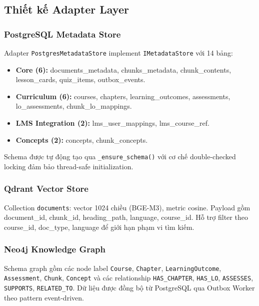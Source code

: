 \subsection{Thiết kế Adapter Layer}

\subsubsection{PostgreSQL Metadata Store}

Adapter \texttt{PostgresMetadataStore} implement
\texttt{IMetadataStore} với 14 bảng:

\begin{itemize}
    \item \textbf{Core (6):} documents\_metadata, chunks\_metadata,
          chunk\_contents, lesson\_cards, quiz\_items, outbox\_events.
    \item \textbf{Curriculum (6):} courses, chapters, learning\_outcomes,
          assessments, lo\_assessments, chunk\_lo\_mappings.
    \item \textbf{LMS Integration (2):} lms\_user\_mappings,
          lms\_course\_ref.
    \item \textbf{Concepts (2):} concepts, chunk\_concepts.
\end{itemize}

Schema được tự động tạo qua \texttt{\_ensure\_schema()} với cơ chế
double-checked locking đảm bảo thread-safe initialization.

\subsubsection{Qdrant Vector Store}

Collection \texttt{documents}: vector 1024 chiều (BGE-M3), metric
cosine. Payload gồm document\_id, chunk\_id, heading\_path,
language, course\_id. Hỗ trợ filter theo course\_id, doc\_type,
language để giới hạn phạm vi tìm kiếm.

\subsubsection{Neo4j Knowledge Graph}

Schema graph gồm các node label \texttt{Course}, \texttt{Chapter},
\texttt{LearningOutcome}, \texttt{Assessment}, \texttt{Chunk},
\texttt{Concept} và các relationship \texttt{HAS\_CHAPTER},
\texttt{HAS\_LO}, \texttt{ASSESSES}, \texttt{SUPPORTS},
\texttt{RELATED\_TO}. Dữ liệu được đồng bộ từ PostgreSQL qua
Outbox Worker theo pattern event-driven.


